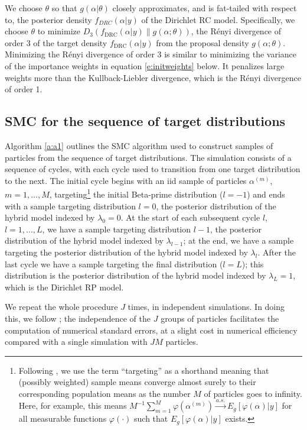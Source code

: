 \documentclass[11pt,letter]{article}
\newcommand{\Dpi}{Dirichlet RP model}
\newcommand{\DP}{Dirichlet RC model}
\begin{document}
We choose $\theta$ so that $g(\alpha|\theta)$ closely approximates, and is fat-tailed with respect to, the posterior density $f_{DRC}(\alpha|y)$ of the \DP{}.
Specifically, we choose $\theta$ to minimize $D_3(f_\mathrm{DRC}(\alpha|y)\|g(\alpha;\theta))$, the R\'enyi divergence of order 3 of the target density $f_\mathrm{DRC}(\alpha|y)$ from the proposal density $g(\alpha;\theta)$.
Minimizing the R\'enyi divergence of order 3 is similar to minimizing the variance of the importance weights in equation \eqref{e:initweights} below.
It penalizes large weights more than the Kullback-Liebler divergence, which is the R\'enyi divergence of order 1.

\subsection{SMC for the sequence of target distributions}

Algorithm \ref{a:a1} outlines the SMC algorithm used to construct samples of particles from the sequence of target distributions.
The simulation consists of a sequence of cycles, with each cycle used to transition from one target distribution to the next.
The initial cycle begins with an iid sample of particles $\alpha^{(m)}$, $m=1,\ldots,M$, targeting\footnote{Following , we use the term ``targeting'' as a shorthand meaning that (possibly weighted) sample means converge almost surely to their corresponding population means as the number $M$ of particles goes to infinity. Here, for example, this means $M^{-1} \sum_{m=1}^M \varphi(\alpha^{(m)}) \overset{a.s.}{\to} E_g[\varphi(\alpha)|y]$ for all measurable functions $\varphi(\cdot)$ such that $E_g[\varphi(\alpha)|y]$ exists.} the initial Beta-prime distribution  ($l=-1$) and ends with a sample targeting distribution $l=0$, the posterior distribution of the hybrid model indexed by $\lambda_0 = 0$.
At the start of each subsequent cycle $l$, $l=1,\ldots,L$, we have a sample targeting distribution $l-1$, the posterior distribution of the hybrid model indexed by $\lambda_{l-1}$; at the end, we have a sample targeting the posterior distribution of the hybrid model indexed by $\lambda_l$.
After the last cycle we have a sample targeting the final distribution ($l=L$); this distribution is the posterior distribution of the hybrid model indexed by $\lambda_L = 1$, which is the \Dpi{}.

We repeat the whole procedure $J$ times, in independent simulations.
In doing this, we follow ; the independence of the $J$ groups of particles facilitates the computation of numerical standard errors, at a slight cost in numerical efficiency compared with a single simulation with $JM$ particles.
\end{document}
